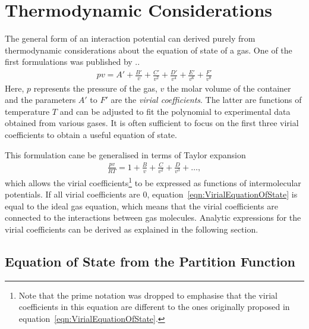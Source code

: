 \section{Thermodynamic Considerations}
\label{sec:ThermodynamicConsiderations}

The general form of an interaction potential can derived purely from
thermodynamic considerations about the equation of state of a gas. One of the
first formulations was published by
\citeauthor{KamerlinghOnnes_Expressionequationstate_1902}.\autocite{KamerlinghOnnes_Expressionequationstate_1902}.
%
\begin{align}
    pv=A'+\frac{B'}{v}+\frac{C'}{v^2}+\frac{D'}{v^4}+\frac{E'}{v^6}+\frac{F'}{v^8}
\end{align}
%
Here, $p$ represents the pressure of the gas, $v$ the molar volume of the
container and the parameters $A'$ to $F'$ are the \textit{virial coefficients}.
The latter are functions of temperature $T$ and can be adjusted to fit the
polynomial to experimental data obtained from various gases. It is often
sufficient to focus on the first three virial coefficients to obtain a useful
equation of state. 

This formulation cane be generalised in terms of Taylor expansion
%
\begin{align}
    \frac{pv}{RT}=1+\frac{B}{v}+\frac{C}{v^2}+\frac{D}{v^3}+\dots,\label{eqn:VirialEquationOfState}
\end{align}
%
which allows the virial coefficients\footnote{Note that the prime notation was
dropped to emphasise that the virial coefficients in this equation are
different to the ones originally proposed in
equation~\ref{eqn:VirialEquationOfState}.} to be expressed as functions of
intermolecular potentials. If all virial coefficients are 0,
equation~\ref{eqn:VirialEquationOfState} is equal to the ideal gas equation,
which means that the virial coefficients are connected to the interactions
between gas molecules. Analytic expressions for the virial coefficients can be
derived as explained in the following section.

\subsection{Equation of State from the Partition Function}
\label{sec:equationofstatefromthepartitionfunction}

